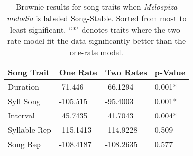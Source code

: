 \documentclass[a4paper,12pt]{article}
\begin{document}
\begin{table}[ht]
\caption{Brownie results for song traits when \textit{Melospiza melodia} is labeled Song-Stable.  Sorted from most to least significant.  ``*" denotes traits where the two-rate model fit the data significantly better than the one-rate model.}
\centering
\begin{tabular}{llll}
  \hline
Song Trait & One Rate & Two Rates & p-Value \\ 
  \hline
Duration & -71.446 & -66.1294 & 0.001* \\ 
  Syll Song & -105.515 & -95.4003 & 0.001* \\ 
  Interval & -45.7435 & -41.7043 & 0.004* \\ 
  Syllable Rep & -115.1413 & -114.9228 & 0.509 \\ 
  Song Rep & -108.4187 & -108.2635 & 0.577 \\ 
   \hline
\end{tabular}
\end{table}
\end{document}
